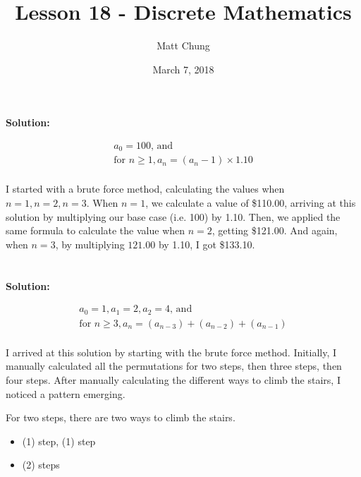 \documentclass{article}
\title{Lesson 18 - Discrete Mathematics}
\author{Matt Chung}
\date{March 7, 2018}
\begin{document}
\maketitle

\section{}
\textbf{Solution: }

\begin{align*}
a_0 = 100 \text{, and}\\
\text{for } n \ge 1, a_n = (a_n - 1) \times 1.10 \\
\end{align*}

I started with a brute force method, calculating the values when $n=1,n=2,n=3$.  When $n=1$, we calculate a value of \$110.00, arriving at this solution by multiplying our base case (i.e. 100) by 1.10. Then, we applied the same formula to calculate the value when $n=2$, getting \$121.00.  And again, when $n=3$, by multiplying $121.00$ by 1.10, I got \$133.10.

\section{}

\subsection{}
\textbf{Solution: }

\begin{align*}
a_0 = 1, a_1 = 2, a_2 = 4 \text{, and }\\
\text{for } n \ge 3, a_n = (a_{n-3}) + (a_{n-2}) + (a_{n-1})\\
\end{align*}

I arrived at this solution by starting with the brute force method. Initially, I manually calculated all the permutations for two steps, then three steps, then four steps.  After manually calculating the different ways to climb the stairs, I noticed a pattern emerging.

For two steps, there are two ways to climb the stairs.

\begin{itemize}
    \item (1) step, (1) step
    \item (2) steps
\end{itemize}
\end{document}
